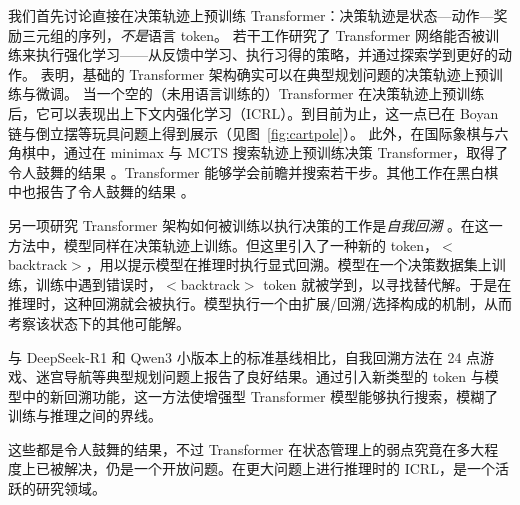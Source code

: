 我们首先讨论直接在决策轨迹上预训练 Transformer：决策轨迹是状态—动作—奖励三元组的序列，{\em 不是}语言 token。%
若干工作研究了 Transformer 网络能否被训练来执行强化学习——从反馈中学习、执行习得的策略，并通过探索学到更好的动作。\citet{chen2021decision,lee2023supervised,wang2024transformers} 表明，基础的 Transformer 架构确实可以在典型规划问题的决策轨迹上预训练与微调。%
当一个空的（未用语言训练的）Transformer 在决策轨迹上预训练后，它可以表现出上下文内强化学习（ICRL）。到目前为止，这一点已在 Boyan 链与倒立摆等玩具问题上得到展示（见图~\ref{fig:cartpole}）。
此外，在国际象棋与六角棋中，通过在 minimax \citep{markeeva2024clrs,knuth1975analysis} 与 MCTS \citep{browne2012survey} 搜索轨迹上预训练决策 Transformer，取得了令人鼓舞的结果 \citep{schultz2024mastering,kempinski2025game}。Transformer 能够学会前瞻并搜索若干步。其他工作在黑白棋中也报告了令人鼓舞的结果 \citep{li2023emergent,kempinski2025game,chen2025if}。

另一项研究 Transformer 架构如何被训练以执行决策的工作是{\em 自我回溯} \citep{yang2026step}。在这一方法中，模型同样在决策轨迹上训练。但这里引入了一种新的 token，$<$backtrack$>$，用以提示模型在推理时执行显式回溯。模型在一个决策数据集上训练，训练中遇到错误时，$<$backtrack$>$ token 就被学到，以寻找替代解。于是在推理时，这种回溯就会被执行。模型执行一个由扩展/回溯/选择构成的机制，从而考察该状态下的其他可能解。

与 DeepSeek-R1 和 Qwen3 小版本上的标准基线相比，自我回溯方法在 24 点游戏、迷宫导航等典型规划问题上报告了良好结果。通过引入新类型的 token 与模型中的新回溯功能，这一方法使增强型 Transformer 模型能够执行搜索，模糊了训练与推理之间的界线。

这些都是令人鼓舞的结果，不过 Transformer 在状态管理上的弱点究竟在多大程度上已被解决，仍是一个开放问题。在更大问题上进行推理时的 ICRL，是一个活跃的研究领域。

